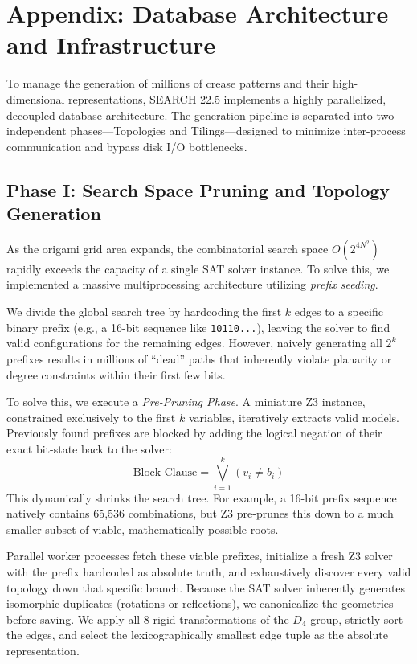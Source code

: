 \documentclass[11pt]{article}
\begin{document}
\section{Appendix: Database Architecture and Infrastructure}
To manage the generation of millions of crease patterns and their high-dimensional representations, SEARCH 22.5 implements a highly parallelized, decoupled database architecture. The generation pipeline is separated into two independent phases—Topologies and Tilings—designed to minimize inter-process communication and bypass disk I/O bottlenecks.

\subsection{Phase I: Search Space Pruning and Topology Generation}
As the origami grid area expands, the combinatorial search space $O(2^{4N^2})$ rapidly exceeds the capacity of a single SAT solver instance. To solve this, we implemented a massive multiprocessing architecture utilizing \textit{prefix seeding}.

We divide the global search tree by hardcoding the first $k$ edges to a specific binary prefix (e.g., a 16-bit sequence like \texttt{10110...}), leaving the solver to find valid configurations for the remaining edges. However, naively generating all $2^k$ prefixes results in millions of ``dead'' paths that inherently violate planarity or degree constraints within their first few bits. 

To solve this, we execute a \textit{Pre-Pruning Phase}. A miniature Z3 instance, constrained exclusively to the first $k$ variables, iteratively extracts valid models. Previously found prefixes are blocked by adding the logical negation of their exact bit-state back to the solver:
\begin{equation}
    \text{Block Clause} = \bigvee_{i=1}^k (v_i \neq b_i)
\end{equation}
This dynamically shrinks the search tree. For example, a 16-bit prefix sequence natively contains 65,536 combinations, but Z3 pre-prunes this down to a much smaller subset of viable, mathematically possible roots.

Parallel worker processes fetch these viable prefixes, initialize a fresh Z3 solver with the prefix hardcoded as absolute truth, and exhaustively discover every valid topology down that specific branch. Because the SAT solver inherently generates isomorphic duplicates (rotations or reflections), we canonicalize the geometries before saving. We apply all 8 rigid transformations of the $D_4$ group, strictly sort the edges, and select the lexicographically smallest edge tuple as the absolute representation. 
\end{document}

